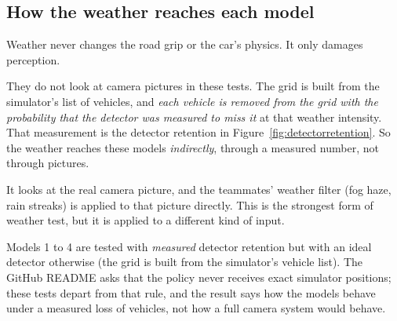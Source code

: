 \documentclass[11pt,a4paper]{article}
\begin{document}
\subsection{How the weather reaches each model}\label{sec:weatherreach}
Weather never changes the road grip or the car's physics. It only damages perception.
\begin{description}[leftmargin=3.2cm,style=nextline]
\item[Models 1 to 4 (grid models)] They do not look at camera pictures in these tests. The grid is built from the simulator's list of vehicles, and \emph{each vehicle is removed from the grid with the probability that the detector was measured to miss it} at that weather intensity. That measurement is the detector retention in Figure~\ref{fig:detectorretention}. So the weather reaches these models \emph{indirectly}, through a measured number, not through pictures.
\item[Model 5 (image-only)] It looks at the real camera picture, and the teammates' weather filter (fog haze, rain streaks) is applied to that picture directly. This is the strongest form of weather test, but it is applied to a different kind of input.
\end{description}
\begin{cautionbox}
Models 1 to 4 are tested with \emph{measured} detector retention but with an ideal detector otherwise (the grid is built from the simulator's vehicle list). The GitHub README asks that the policy never receives exact simulator positions; these tests depart from that rule, and the result says how the models behave under a measured loss of vehicles, not how a full camera system would behave.
\end{cautionbox}

\end{document}
